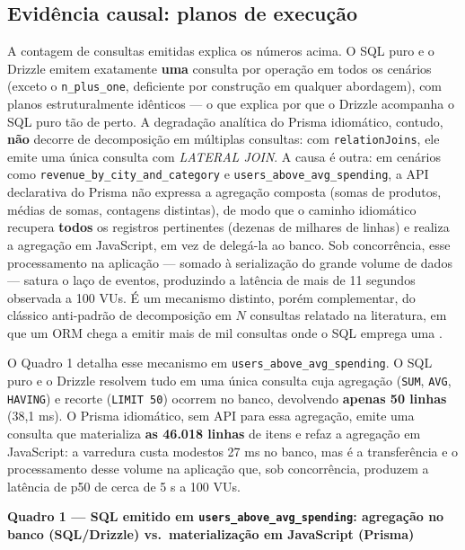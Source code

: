 \documentclass[12pt]{article}
\begin{document}
\subsection{Evidência causal: planos de execução}

A contagem de consultas emitidas explica os números acima. O SQL puro e o
Drizzle emitem exatamente \textbf{uma} consulta por operação em todos os
cenários (exceto o \texttt{n\_plus\_one}, deficiente por construção em
qualquer abordagem), com planos estruturalmente idênticos --- o que
explica por que o Drizzle acompanha o SQL puro tão de perto. A degradação analítica do Prisma idiomático, contudo,
\textbf{não} decorre de decomposição em múltiplas consultas: com
\texttt{relationJoins}, ele emite uma única consulta com \textit{LATERAL
JOIN}. A causa é outra: em cenários como
\texttt{revenue\_by\_city\_and\_category} e
\texttt{users\_above\_avg\_spending}, a API declarativa do Prisma não
expressa a agregação composta (somas de produtos, médias de somas,
contagens distintas), de modo que o caminho idiomático recupera
\textbf{todos} os registros pertinentes (dezenas de milhares de linhas) e
realiza a agregação em JavaScript, em vez de delegá-la ao banco. Sob
concorrência, esse processamento na aplicação --- somado à serialização
do grande volume de dados --- satura o laço de eventos, produzindo a
latência de mais de 11 segundos observada a 100 VUs. É um mecanismo
distinto, porém complementar, do clássico anti-padrão de decomposição em
$N$ consultas relatado na literatura, em que um ORM chega a emitir mais
de mil consultas onde o SQL emprega uma \cite{colley2020}.

O Quadro 1 detalha esse mecanismo em
\texttt{users\_above\_avg\_spending}. O SQL puro e o Drizzle resolvem tudo
em uma única consulta cuja agregação (\texttt{SUM}, \texttt{AVG},
\texttt{HAVING}) e recorte (\texttt{LIMIT 50}) ocorrem no banco,
devolvendo \textbf{apenas 50 linhas} (38,1 ms). O Prisma idiomático, sem
API para essa agregação, emite uma consulta que materializa \textbf{as
46.018 linhas} de itens e refaz a agregação em JavaScript: a varredura
custa modestos 27 ms no banco, mas é a transferência e o processamento
desse volume na aplicação que, sob concorrência, produzem a latência de
p50 de cerca de 5 s a 100 VUs.

\vspace{6pt}
\noindent\textbf{Quadro 1 --- SQL emitido em
\texttt{users\_above\_avg\_spending}: agregação no banco (SQL/Drizzle)
vs.\ materialização em JavaScript (Prisma)}
\vspace{2pt}
\end{document}
